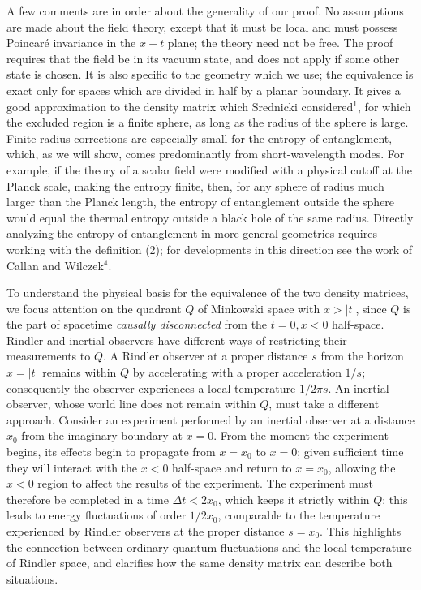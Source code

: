 A few comments are in order about the generality of our proof.
No assumptions are made about the field theory, except that it must be
local and must possess Poincar\'e
invariance in the $x-t$ plane;
the theory need not be free.
The proof requires that the field be in its vacuum state,
and does not apply if some other
state is chosen.
It is also specific to the geometry
which we use; the equivalence is exact only for
spaces which are divided in half by a planar
boundary.   It gives a good approximation
to the density matrix which Srednicki considered$^1$, for which the
excluded region is a finite sphere, as long as the
 radius of the sphere is large.
Finite radius corrections are especially small for the
entropy of entanglement, which, as we will show,
comes predominantly from short-wavelength modes.
For example,
if the theory of a scalar field were modified
with a physical cutoff at the Planck
scale, making the entropy finite, then, for any sphere
of radius much larger than the Planck length,
the entropy of entanglement
outside the sphere would equal the thermal entropy
outside a black hole of the same radius.
Directly analyzing the entropy of entanglement in more
general geometries requires working with the definition (2);
for developments in this direction see the work of Callan and Wilczek$^4$.


To understand the physical basis for the equivalence of the two density
matrices, we focus attention on the quadrant $Q$ of Minkowski
space with $x > \vert t \vert$, since $Q$ is the part of spacetime
{\it causally disconnected} from the
$t=0, x<0$ half-space. Rindler and inertial observers have different ways of
restricting their measurements to $Q$.  A Rindler observer at a proper
distance $s$ from the horizon $x = \vert t \vert$ remains within
$Q$ by accelerating with a proper acceleration $1/s$; consequently
the observer
experiences a local temperature $1/2\pi s$.
An inertial observer, whose world line does not remain within $Q$, must
take a different approach. Consider an experiment performed by
an inertial observer at a distance $x_0$ from the imaginary
boundary at $x=0$.  From the moment the experiment
begins, its effects begin to
propagate from $x=x_0$ to $x=0$; given sufficient time they
will interact
with the $x<0$ half-space and return to $x=x_0$, allowing
the $x<0$ region to affect the
results of the experiment.  The experiment must therefore
be completed in a time $\Delta t < 2x_0$, which keeps it strictly within $Q$;
this leads to energy fluctuations of order $1/2x_0$, comparable to the
temperature experienced by Rindler observers at the proper distance $s=x_0$.
This highlights the
connection between ordinary quantum fluctuations and the
local temperature of Rindler space, and clarifies how the same density
matrix can describe both situations.

